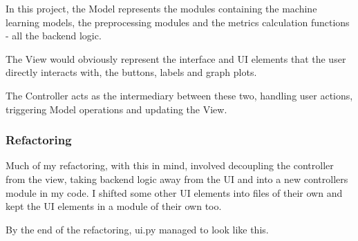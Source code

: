 \documentclass[letterpaper,10pt]{article}
\begin{document}
In this project, the Model represents the modules containing the machine learning models, the preprocessing modules and the metrics calculation functions - all the backend logic. \par
The View would obviously represent the interface and UI elements that the user directly interacts with, the buttons, labels and graph plots. \par
The Controller acts as the intermediary between these two, handling user actions, triggering Model operations and updating the View. 

\subsubsection{Refactoring}
Much of my refactoring, with this in mind, involved decoupling the controller from the view, taking backend logic away from the UI and into a new controllers module in my code. I shifted some other UI elements into files of their own and kept the UI elements in a module of their own too. \par
By the end of the refactoring, ui.py managed to look like this.
\end{document}
